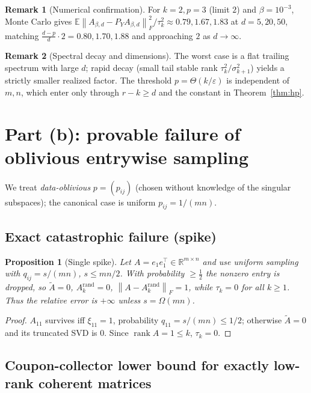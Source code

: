 \documentclass{amsart}
\newtheorem{proposition}{Proposition}
\theoremstyle{definition}
\newtheorem{remark}{Remark}
\DeclareMathOperator{\rank}{rank}
\newcommand{\R}{\mathbb{R}}
\newcommand{\Frob}[1]{\left\lVert #1\right\rVert_F}
\newcommand{\Atil}{\widetilde{A}}
\newcommand{\E}{\mathbb{E}}
\begin{document}
\begin{remark}[Numerical confirmation]\label{rem:numlb}
For $k=2,p=3$ (limit $2$) and $\beta=10^{-3}$, Monte Carlo gives
$\E\Frob{A_{\beta,d}-P_YA_{\beta,d}}^2/\tau_k^2\approx0.79,1.67,1.83$ at
$d=5,20,50$, matching $\frac{d-p}{d}\cdot2=0.80,1.70,1.88$ and approaching $2$
as $d\to\infty$.
\end{remark}

\begin{remark}[Spectral decay and dimensions]
The worst case is a flat trailing spectrum with large $d$; rapid decay (small
tail stable rank $\tau_k^2/\sigma_{k+1}^2$) yields a strictly smaller realized
factor. The threshold $p=\Theta(k/\varepsilon)$ is independent of $m,n$, which
enter only through $r-k\ge d$ and the constant in Theorem~\ref{thm:hp}.
\end{remark}

\section{Part (b): provable failure of oblivious entrywise sampling}

We treat \emph{data-oblivious} $p=(p_{ij})$ (chosen without knowledge of the
singular subspaces); the canonical case is uniform $p_{ij}=1/(mn)$.

\subsection{Exact catastrophic failure (spike)}

\begin{proposition}[Single spike]\label{prop:spike}
Let $A=e_1e_1^\top\in\R^{m\times n}$ and use uniform sampling with $q_{ij}=s/(mn)$,
$s\le mn/2$. With probability $\ge\tfrac12$ the nonzero entry is dropped, so
$\Atil=0$, $A_k^{\mathrm{rand}}=0$, $\Frob{A-A_k^{\mathrm{rand}}}=1$, while
$\tau_k=0$ for all $k\ge1$. Thus the relative error is $+\infty$ unless
$s=\Omega(mn)$.
\end{proposition}

\begin{proof}
$A_{11}$ survives iff $\xi_{11}=1$, probability $q_{11}=s/(mn)\le1/2$; otherwise
$\Atil=0$ and its truncated SVD is $0$. Since $\rank A=1\le k$, $\tau_k=0$.
\end{proof}

\subsection{Coupon-collector lower bound for exactly low-rank coherent matrices}
\end{document}

